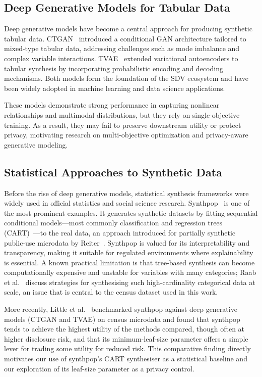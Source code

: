 \documentclass[11pt]{article}
\begin{document}
\subsection{Deep Generative Models for Tabular Data}

Deep generative models have become a central approach for producing synthetic tabular data. CTGAN~\cite{xu2019modeling} introduced a conditional GAN architecture tailored to mixed-type tabular data, addressing challenges such as mode imbalance and complex variable interactions. TVAE~\cite{xu2018synthesizing} extended variational autoencoders to tabular synthesis by incorporating probabilistic encoding and decoding mechanisms. Both models form the foundation of the SDV ecosystem and have been widely adopted in machine learning and data science applications.

These models demonstrate strong performance in capturing nonlinear relationships and multimodal distributions, but they rely on single-objective training. As a result, they may fail to preserve downstream utility or protect privacy, motivating research on multi-objective optimization and privacy-aware generative modeling.

\subsection{Statistical Approaches to Synthetic Data}

Before the rise of deep generative models, statistical synthesis frameworks were widely used in official statistics and social science research. Synthpop~\cite{nowok2016synthpop} is one of the most prominent examples. It generates synthetic datasets by fitting sequential conditional models—most commonly classification and regression trees (CART)~\cite{breiman1984cart}—to the real data, an approach introduced for partially synthetic public-use microdata by Reiter~\cite{reiter2005cart}. Synthpop is valued for its interpretability and transparency, making it suitable for regulated environments where explainability is essential. A known practical limitation is that tree-based synthesis can become computationally expensive and unstable for variables with many categories; Raab et al.~\cite{raab2016practical} discuss strategies for synthesising such high-cardinality categorical data at scale, an issue that is central to the census dataset used in this work.

More recently, Little et al.~\cite{little2025synthetic} benchmarked synthpop against deep generative models (CTGAN and TVAE) on census microdata and found that synthpop tends to achieve the highest utility of the methods compared, though often at higher disclosure risk, and that its minimum-leaf-size parameter offers a simple lever for trading some utility for reduced risk. This comparative finding directly motivates our use of synthpop's CART synthesiser as a statistical baseline and our exploration of its leaf-size parameter as a privacy control.
\end{document}
